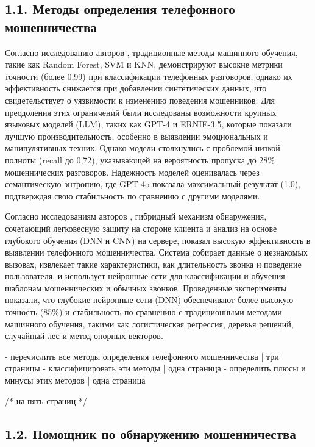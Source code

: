\subsection*{1.1. Методы определения телефонного мошенничества}

Согласно исследованию авторов  \cite{shen2024combating}, традиционные методы машинного обучения, такие как Random Forest, SVM и KNN, демонстрируют высокие метрики точности (более 0,99) при классификации телефонных разговоров, однако их эффективность снижается при добавлении синтетических данных, что свидетельствует о уязвимости к изменению поведения мошенников. Для преодоления этих ограничений были исследованы возможности крупных языковых моделей (LLM), таких как GPT-4 и ERNIE-3.5, которые показали лучшую производительность, особенно в выявлении эмоциональных и манипулятивных техник. Однако модели столкнулись с проблемой низкой полноты (recall до 0,72), указывающей на вероятность пропуска до 28\% мошеннических разговоров. Надежность моделей оценивалась через семантическую энтропию, где GPT-4o показала максимальный результат (1.0), подтверждая свою стабильность по сравнению с другими моделями.

Согласно исследованиям авторов \cite{hooper2024}, гибридный механизм обнаружения, сочетающий легковесную защиту на стороне клиента и анализ на основе глубокого обучения (DNN и CNN) на сервере, показал высокую эффективность в выявлении телефонного мошенничества. Система собирает данные о незнакомых вызовах, извлекает такие характеристики, как длительность звонка и поведение пользователя, и использует нейронные сети для классификации и обучения шаблонам мошеннических и обычных звонков.  Проведенные эксперименты показали, что глубокие нейронные сети (DNN) обеспечивают более высокую точность (85\%) и стабильность по сравнению с традиционными методами машинного обучения, такими как логистическая регрессия, деревья решений, случайный лес и метод опорных векторов.

- перечислить все методы определения телефонного мошенничества | три страницы
- классифицировать эти методы | одна страница
- определить плюсы и минусы этих методов | одна страница

/* на пять страниц */

\subsection*{1.2. Помощник по обнаружению мошенничества}

